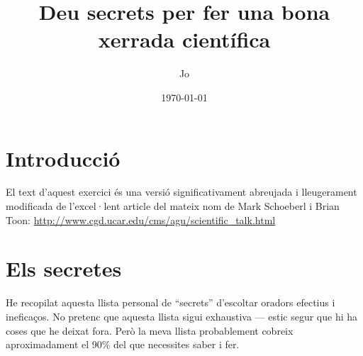 \documentclass[12pt]{article}
\title{Deu secrets per fer una bona xerrada científica}
\author{Jo}
\date{\today}
\begin{document}
\maketitle

\section{Introducció}

El text d'aquest exercici és una versió significativament abreujada i lleugerament modificada de l'excel·lent article del mateix nom de Mark Schoeberl i Brian Toon:
\url{http://www.cgd.ucar.edu/cms/agu/scientific_talk.html}

\section{Els secretes}

He recopilat aquesta llista personal de ``secrets'' d'escoltar oradors efectius i ineficaços. No pretenc que aquesta llista sigui exhaustiva --- estic segur que hi ha coses que he deixat fora. Però la meva llista probablement cobreix aproximadament el 90\% del que necessites saber i fer.
\end{document}
